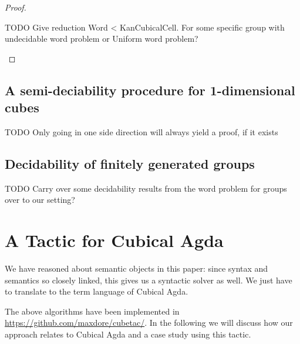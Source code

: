 \documentclass{llncs}
\newcommand{\todo}[1]{
  \begin{tcolorbox}
    TODO {#1} 
  \end{tcolorbox}
}
\newcommand{\cset}[1]{\ensuremath{\mathsf{{#1}}}}
\begin{document}
\begin{theorem}
\begin{proof}


    \todo{Give reduction Word < KanCubicalCell. For some specific group with
      undecidable word problem or Uniform word problem? }
\end{proof}
\end{theorem}


\subsection{A semi-deciability procedure for 1-dimensional cubes}

\todo{Only going in one side direction will always yield a proof, if it exists}

\subsection{Decidability of finitely generated groups}

\todo{Carry over some decidability results from the word problem for groups over
to our setting?}





\section{A Tactic for Cubical Agda}
\label{sec:cubicalagda}

We have reasoned about semantic objects in this paper: since syntax and semantics so
closely linked, this gives us a syntactic solver as well. We just have to
translate to the term language of Cubical Agda.

The above algorithms have been implemented in
\url{https://github.com/maxdore/cubetac/}. In the following we will discuss how
our approach relates to Cubical Agda and a case study using this tactic.
\end{document}
